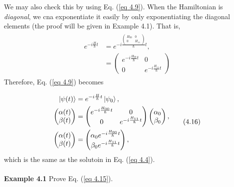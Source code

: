 \documentclass{article}
\begin{document}
We may also check this by using Eq. (\ref{eq 4.9}). When the Hamiltonian is \textit{diagonal},
we cna exponentiate it easily by only exponentiating the diagonal elements (the proof will be given in Example 4.1).
That is,
\begin{align} \label{eq 4.15}
    \begin{split}
        e^{-i\frac{H}{\hbar}t} &= e^{-i\frac{\begin{pmatrix}
            H_{00} & 0\\ 0 &H_{11}
        \end{pmatrix}}{\hbar}t},\\
        &= \begin{pmatrix}
            e^{-i\frac{H_{00}}{\hbar}t} & 0\\0 & e^{-i\frac{H_{11}}{\hbar}t}
        \end{pmatrix}
    \end{split} \tag{4.15}
\end{align}
Therefore, Eq. (\ref{eq 4.9}) becomes

\begin{align} \label{eq 4.16}
    \begin{split}
      \ket{\psi(t)}&= e^{-i\frac{H}{\hbar}t}\ket{\psi_0},\\
      \begin{pmatrix}
          \alpha(t) \\ \beta(t)
        \end{pmatrix} &=\begin{pmatrix}
           e^{-i\frac{H_{00}}{\hbar}t} & 0\\0 & e^{-i\frac{H_{11}}{\hbar}t}
        \end{pmatrix} 
        \begin{pmatrix}
              \alpha_0\\ \beta_0
       \end{pmatrix},\\
        \begin{pmatrix}
            \alpha(t) \\ \beta(t)
        \end{pmatrix}&
        =\begin{pmatrix}
            \alpha_0 e^{-i\frac{H_{00}}{\hbar}t} \\ \beta_0 e^{-i\frac{H_{11}}{\hbar}t} 
        \end{pmatrix},
   \end{split} \tag{4.16}
\end{align}
which is the same as the solutoin in Eq. (\ref{eq 4.4}).
\\\\
\textbf{Example 4.1} Prove Eq. (\ref{eq 4.15}).
\end{document}
